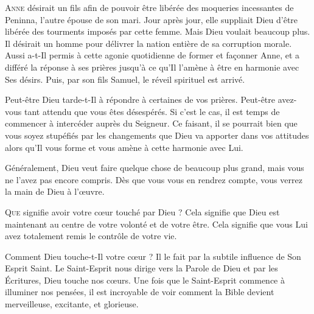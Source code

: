 \lettrine{A}{nne} désirait un fils afin de pouvoir être libérée
 des moqueries incessantes de Peninna, l'autre épouse de son mari.
 Jour après jour, elle suppliait Dieu d'être libérée des tourments
 imposés par cette femme.
 Mais Dieu voulait beaucoup plus. Il désirait un homme pour délivrer
 la nation entière de sa corruption morale.
 Aussi a-t-Il permis à cette agonie quotidienne de former et fa\c{c}onner Anne,
 et a différé la réponse à ses prières jusqu'à ce qu'Il l'amène
 à être en harmonie avec Ses désirs.
 Puis, par son fils Samuel, le réveil spirituel est arrivé.

Peut-être Dieu tarde-t-Il à répondre à certaines de vos prières.
 Peut-être avez-vous tant attendu que vous êtes désespérés.
 Si c'est le cas, il est temps de commencer à intercéder auprès du Seigneur.
 Ce faisant, il se pourrait bien que vous soyez stupéfiés par les changements
 que Dieu va apporter dans vos attitudes alors qu'Il vous forme
 et vous amène à cette harmonie avec Lui.


Généralement, Dieu veut faire quelque chose de beaucoup plus grand,
 mais vous ne l'avez pas encore compris.
 Dès que vous vous en rendrez compte, vous verrez la main de Dieu à l'\oe{}uvre. 

\dvrule






\lettrine{Q}{ue} signifie avoir votre c\oe{}ur touché par Dieu ?
 Cela signifie que Dieu est maintenant au centre de votre volonté
 et de votre être.
 Cela signifie que vous Lui avez totalement remis le contrôle de votre vie.

Comment Dieu touche-t-Il votre c\oe{}ur ?
 Il le fait par la subtile influence de Son Esprit Saint. 
 Le Saint-Esprit nous dirige vers la Parole de Dieu et par les Écritures,
 Dieu touche nos c\oe{}urs.
 Une fois que le Saint-Esprit commence à illuminer nos pensées,
 il est incroyable de voir comment la Bible devient merveilleuse,
 excitante, et glorieuse.

